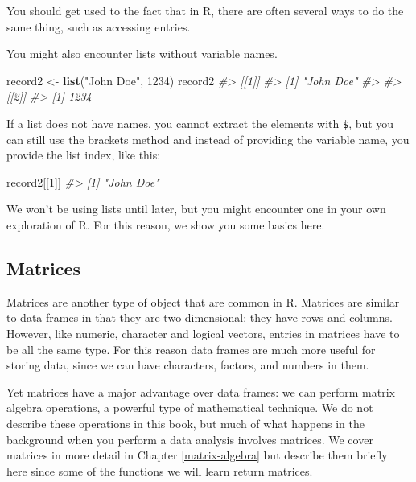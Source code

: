 \documentclass[
]{krantz}
\newenvironment{Shaded}{\begin{snugshade}}{\end{snugshade}}
\newcommand{\CommentTok}[1]{\textcolor[rgb]{0.37,0.37,0.37}{\textit{#1}}}
\newcommand{\DecValTok}[1]{\textcolor[rgb]{0.06,0.06,0.06}{#1}}
\newcommand{\KeywordTok}[1]{\textcolor[rgb]{0.27,0.27,0.27}{\textbf{#1}}}
\newcommand{\NormalTok}[1]{#1}
\newcommand{\StringTok}[1]{\textcolor[rgb]{0.5,0.5,0.5}{#1}}
\begin{document}
You should get used to the fact that in R, there are often several ways to do the same thing, such as accessing entries.

You might also encounter lists without variable names.

\begin{Shaded}
\begin{Highlighting}[]
\NormalTok{record2 <-}\StringTok{ }\KeywordTok{list}\NormalTok{(}\StringTok{"John Doe"}\NormalTok{, }\DecValTok{1234}\NormalTok{)}
\NormalTok{record2}
\CommentTok{#> [[1]]}
\CommentTok{#> [1] "John Doe"}
\CommentTok{#> }
\CommentTok{#> [[2]]}
\CommentTok{#> [1] 1234}
\end{Highlighting}
\end{Shaded}

If a list does not have names, you cannot extract the elements with \texttt{\$}, but you can still use the brackets method and instead of providing the variable name, you provide the list index, like this:

\begin{Shaded}
\begin{Highlighting}[]
\NormalTok{record2[[}\DecValTok{1}\NormalTok{]]}
\CommentTok{#> [1] "John Doe"}
\end{Highlighting}
\end{Shaded}

We won't be using lists until later, but you might encounter one in your own exploration of R. For this reason, we show you some basics here.

\hypertarget{matrices}{%
\subsection{Matrices}\label{matrices}}

Matrices are another type of object that are common in R. Matrices are similar to data frames in that they are two-dimensional: they have rows and columns. However, like numeric, character and logical vectors, entries in matrices have to be all the same type. For this reason data frames are much more useful for storing data, since we can have characters, factors, and numbers in them.

Yet matrices have a major advantage over data frames: we can perform matrix algebra operations, a powerful type of mathematical technique. We do not describe these operations in this book, but much of what happens in the background when you perform a data analysis involves matrices. We cover matrices in more detail in Chapter \ref{matrix-algebra} but describe them briefly here since some of the functions we will learn return matrices.
\end{document}
